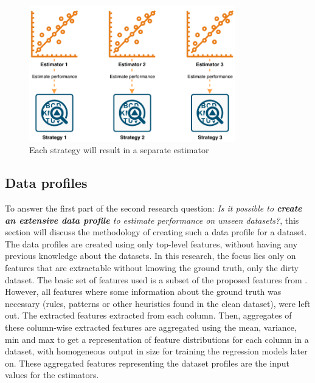 \begin{figure}[h]
	\centering
	\includegraphics[width=0.8\textwidth]{thesis/Figures/Method/PerformanceEstimation-OnlyEstimate.pdf}
	\caption{Each strategy will result in a separate estimator}
	\label{fig:eachstrategy}
\end{figure}

\subsection{Data profiles}
\label{subsec:dataprofiles}
To answer the first part of the second research question: \textit{Is  it  possible  to  \textbf{create an extensive data profile} to estimate performance on unseen datasets?}, this section will discuss the methodology of creating such a data profile for a dataset.
The data profiles are created using only top-level features, without having any previous knowledge about the datasets. In this research, the focus lies only on features that are extractable without knowing the ground truth, only the dirty dataset. The basic set of features used is a subset of the proposed features from \cite{Mahdavi2019-pk}. However, all features where some information about the ground truth was necessary (rules, patterns or other heuristics found in the clean dataset), were left out. The extracted features extracted from each column. Then, aggregates of these column-wise extracted features are aggregated using the mean, variance, min and max to get a representation of feature distributions for each column in a dataset, with homogeneous output in size for training the regression models later on. These aggregated features representing the dataset profiles are the input values for the estimators. 

